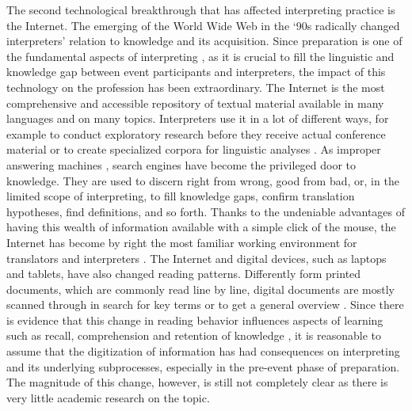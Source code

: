 \documentclass[output=paper]{langsci/langscibook}
\begin{document}
The second technological breakthrough that has affected interpreting practice is the Internet. The emerging of the World Wide Web in the ‘90s radically changed interpreters’ relation to knowledge and its acquisition. Since preparation is one of the fundamental aspects of interpreting \citep{Gile2009}, as it is crucial to fill the linguistic and knowledge gap between event participants and interpreters, the impact of this technology on the profession has been extraordinary. The Internet is the most comprehensive and accessible repository of textual material available in many languages and on many topics. Interpreters use it in a lot of different ways, for example to conduct exploratory research before they receive actual conference material \citep{chang_conference_2018} or to create specialized corpora for linguistic analyses \citep{Fantinuoli2017a,Fantinuoli2018c,xu_corpus-based_2018}. As improper answering machines \citep{finn_what_2017}, search engines have become the privileged door to knowledge. They are used to discern right from wrong, good from bad, or, in the limited scope of interpreting, to fill knowledge gaps, confirm translation hypotheses, find definitions, and so forth. Thanks to the undeniable advantages of having this wealth of information available with a simple click of the mouse, the Internet has become by right the most familiar working environment for translators and interpreters \citep{zanettin_corpora_2002}. The Internet and digital devices, such as laptops and tablets, have also changed reading patterns. Differently form printed documents, which are commonly read line by line, digital documents are mostly scanned through in search for key terms or to get a general overview \citep{pernice_f-shaped_2017}. Since there is evidence that this change in reading behavior influences aspects of learning such as recall, comprehension and retention of knowledge \citep{ross_print_2017}, it is reasonable to assume that the digitization of information has had consequences on interpreting and its underlying subprocesses, especially in the pre-event phase of preparation. The magnitude of this change, however, is still not completely clear as there is very little academic research on the topic.  
 
\end{document}
